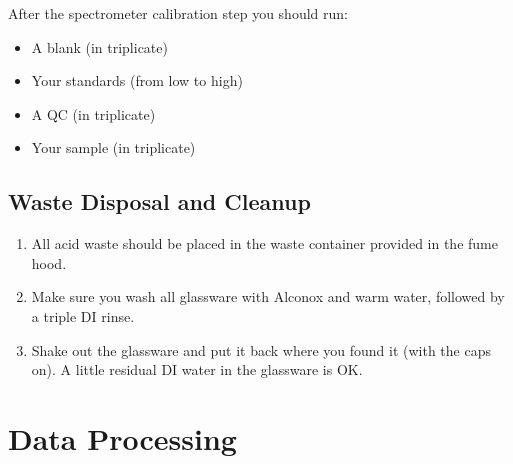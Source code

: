 \documentclass[]{tufte-book}
\providecommand{\tightlist}{%
  \setlength{\itemsep}{0pt}\setlength{\parskip}{0pt}}
\begin{document}
After the spectrometer calibration step you should run:

\begin{itemize}
\tightlist
\item
  A blank (in triplicate)
\item
  Your standards (from low to high)
\item
  A QC (in triplicate)
\item
  Your sample (in triplicate)
\end{itemize}

\hypertarget{waste-disposal-and-cleanup}{%
\subsection{Waste Disposal and Cleanup}\label{waste-disposal-and-cleanup}}

\begin{enumerate}
\def\labelenumi{\arabic{enumi}.}
\tightlist
\item
  All acid waste should be placed in the waste container provided in the fume hood.
\item
  Make sure you wash all glassware with Alconox and warm water, followed by a triple DI rinse.
\item
  Shake out the glassware and put it back where you found it (with the caps on). A little residual DI water in the glassware is OK.
\end{enumerate}

\hypertarget{uv-vis-data}{%
\section{Data Processing}\label{uv-vis-data}}
\end{document}
